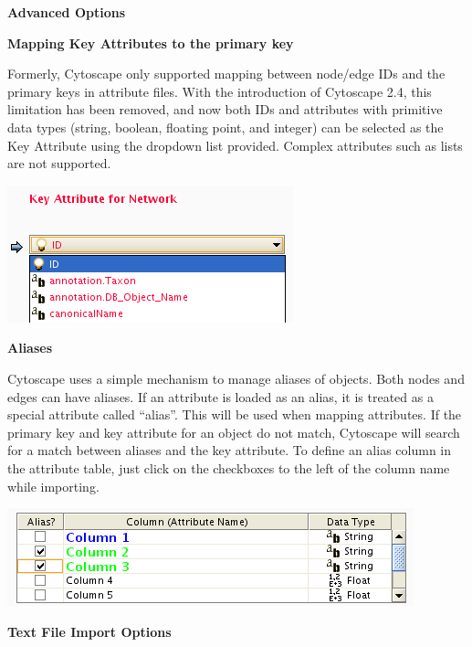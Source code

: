 
\textbf{Advanced Options}


 \textbf{Mapping Key Attributes to the primary key}


 Formerly, Cytoscape only supported mapping between node/edge IDs and the primary keys in attribute files. With the introduction of Cytoscape 2.4, this limitation has been removed, and now both IDs and attributes with primitive data types (string, boolean, floating point, and integer) can be selected as the Key Attribute using the dropdown list provided. Complex attributes such as lists are not supported. 


 \includegraphics[width=\textwidth]{images/attribute_table_import_keyattr.png} 


 
\textbf{Aliases}


 Cytoscape uses a simple mechanism to manage aliases of objects. Both nodes and edges can have aliases. If an attribute is loaded as an alias, it is treated as a special attribute called ``alias''. This will be used when mapping attributes. If the primary key and key attribute for an object do not match, Cytoscape will search for a match between aliases and the key attribute. To define an alias column in the attribute table, just click on the checkboxes to the left of the column name while importing. 


 \includegraphics[width=\textwidth]{images/attribute_table_import_alias.png} 


 
\textbf{Text File Import Options}


